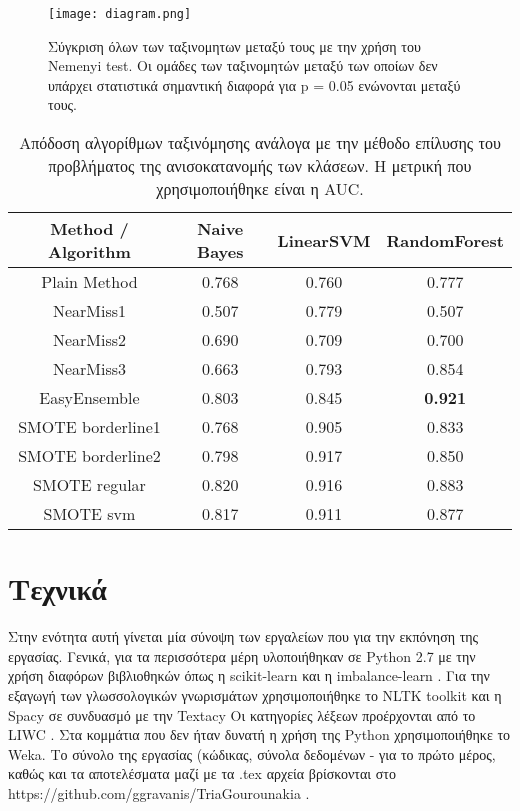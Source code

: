 \begin{figure}
	\centering
	\texttt{[image: diagram.png]} %
	\caption{Σύγκριση όλων των ταξινομητων μεταξύ τους με την χρήση του Nemenyi test. Οι ομάδες των ταξινομητών μεταξύ των οποίων δεν υπάρχει στατιστικά σημαντική διαφορά για p = 0.05 ενώνονται μεταξύ τους.}
	\label{fig:balance}
\end{figure}

\begin{table*}
	\centering
	\caption{Απόδοση αλγορίθμων ταξινόμησης ανάλογα με την μέθοδο επίλυσης του προβλήματος της ανισοκατανομής των κλάσεων. Η μετρική που χρησιμοποιήθηκε είναι η AUC.}
	\label{tab: imbalance}
	\begin{tabular}{cccc}
			\hline
		\ttfamily Method / Algorithm & \ttfamily Naive Bayes & \ttfamily LinearSVM & \ttfamily RandomForest 	\\	\hline
		Plain Method & 0.768       & 0.760     & 0.777         \\ \hline
		NearMiss1 & 0.507       & 0.779     & 0.507\\ \hline
		NearMiss2 & 0.690       & 0.709     & 0.700\\ \hline
		NearMiss3 & 0.663       & 0.793     & 0.854\\ \hline
		EasyEnsemble & 0.803       & 0.845     & \textbf{0.921}\\ \hline
		SMOTE borderline1 & 0.768       & 0.905     & 0.833\\ \hline
		SMOTE borderline2 & 0.798       & 0.917     & 0.850\\ \hline
		SMOTE regular & 0.820       & 0.916     & 0.883\\ \hline
		SMOTE svm & 0.817       & 0.911     & 0.877\\ \hline
		

	\end{tabular}
\end{table*}


\section{Τεχνικά}

Στην ενότητα αυτή γίνεται μία σύνοψη των εργαλείων που για την εκπόνηση της εργασίας.
Γενικά, για τα περισσότερα μέρη υλοποιήθηκαν σε Python 2.7 με την χρήση διαφόρων βιβλιοθηκών
όπως η scikit-learn \citep{scikit-learn} και η imbalance-learn \citep{JMLR:v18:16-365}. Για την εξαγωγή των 
γλωσσολογικών γνωρισμάτων χρησιμοποιήθηκε το NLTK toolkit \citep{Bird:2006} και η Spacy σε συνδυασμό με την Textacy \citep{spacy} Οι κατηγορίες λέξεων προέρχονται από το LIWC \citep{LIWC}. Στα κομμάτια που δεν ήταν δυνατή η χρήση της Python χρησιμοποιήθηκε το Weka. Το σύνολο της εργασίας (κώδικας, σύνολα δεδομένων - για το πρώτο μέρος, καθώς και τα αποτελέσματα μαζί με τα .tex αρχεία βρίσκονται στο \\ https://github.com/ggravanis/TriaGourounakia .

